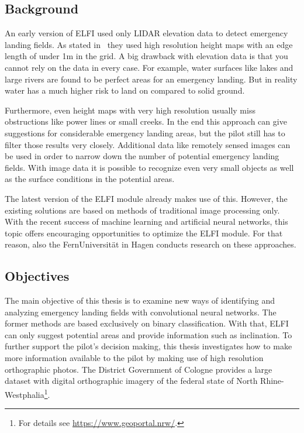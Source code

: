 \subsection{Background}
An early version of ELFI used only LIDAR elevation data to detect emergency landing fields. As stated in~\cite{feu_elfi} they used high resolution height maps with an edge length of under 1m in the grid. A big drawback with elevation data is that you cannot rely on the data in every case. For example, water surfaces like lakes and large rivers are found to be perfect areas for an emergency landing. But in reality water has a much higher risk to land on compared to solid ground.

Furthermore, even height maps with very high resolution usually miss obstructions like power lines or small creeks. In the end this approach can give suggestions for considerable emergency landing areas, but the pilot still has to filter those results very closely. Additional data like remotely sensed images can be used in order to narrow down the number of potential emergency landing fields. With image data it is possible to recognize even very small objects as well as the surface conditions in the potential areas.

The latest version of the ELFI module already makes use of this. However, the existing solutions are based on methods of traditional image processing only. With the recent success of machine learning and artificial neural networks, this topic offers encouraging opportunities to optimize the ELFI module. For that reason, also the FernUniversität in Hagen conducts research on these approaches.

\subsection{Objectives}
The main objective of this thesis is to examine new ways of identifying and analyzing emergency landing fields with convolutional neural networks. The former methods are based exclusively on binary classification. With that, ELFI can only suggest potential areas and provide information such as inclination. To further support the pilot's decision making, this thesis investigates how to make more information available to the pilot by making use of high resolution orthographic photos. The District Government of Cologne provides a large dataset with digital orthographic imagery of the federal state of North Rhine-Westphalia\footnote{For details see \url{https://www.geoportal.nrw/}.}.

